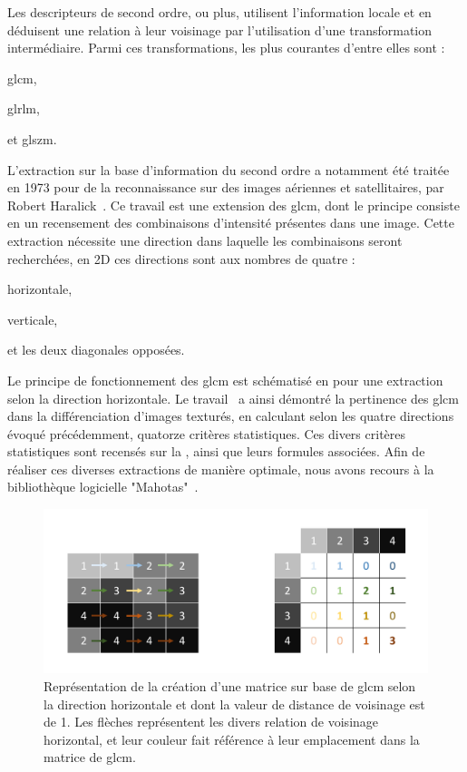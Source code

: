 Les descripteurs de second ordre, ou plus, utilisent l'information locale et en déduisent une relation à leur voisinage par l'utilisation d'une transformation intermédiaire. Parmi ces transformations, les plus courantes d'entre elles sont : 
\begin{inlinerate}
    \item \gls{glcm},
    \item \gls{glrlm},
    \item et \gls{glszm}.
\end{inlinerate} 
L'extraction sur la base d'information du second ordre a notamment été traitée en 1973 pour de la reconnaissance sur des images aériennes et satellitaires, par Robert Haralick~\cite{Haralick1973}. Ce travail est une extension des \gls{glcm}, dont le principe consiste en un recensement des combinaisons d'intensité présentes dans une image. Cette extraction nécessite une direction dans laquelle les combinaisons seront recherchées, en 2D ces directions sont aux nombres de quatre :
\begin{inlinerate}
    \item horizontale,
    \item verticale,
    \item et les deux diagonales opposées.
\end{inlinerate}
Le principe de fonctionnement des \gls{glcm} est schématisé en  pour une extraction selon la direction horizontale. Le travail~\cite{Haralick1973} a ainsi démontré la pertinence des \gls{glcm} dans la différenciation d'images texturés, en calculant selon les quatre directions évoqué précédemment, quatorze critères statistiques. Ces divers critères statistiques sont recensés sur la , ainsi que leurs formules associées. Afin de réaliser ces diverses extractions de manière optimale, nous avons recours à la bibliothèque logicielle "Mahotas"~\cite{coelho2012}.\par
 
\begin{figure}[H]
    \centering
    \includegraphics[width=\linewidth]{contents/chapter_4/resources/scheme_principle_GLCM.pdf}
    \caption{Représentation de la création d'une matrice sur base de \gls{glcm} selon la direction horizontale et dont la valeur de distance de voisinage est de 1. Les flèches représentent les divers relation de voisinage horizontal, et leur couleur fait référence à leur emplacement dans la matrice de \gls{glcm}.}
    \label{fig:scheme_principle_GLCM}
\end{figure}\par

